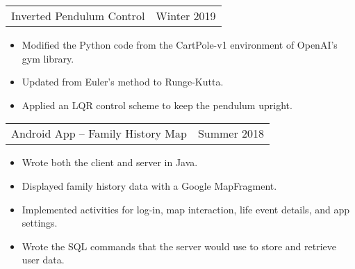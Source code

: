 \documentclass{article}
\newenvironment{compactItemize}{
  \begin{itemize}[itemsep=0ex, parsep=0ex, partopsep=0ex, topsep= -7pt]
}{
  \end{itemize}
}
\newcommand{\project}[2]{
  \begingroup
  \setlength{\tabcolsep}{0ex}
  \begin{tabularx}{\linewidth}{X r}
    #1 & %
    #2\\ %
  \end{tabularx}%
  \endgroup%
}
\begin{document}
\project{Inverted Pendulum Control}{Winter 2019}
\begin{compactItemize}
  \item Modified the Python code from the CartPole-v1 environment of OpenAI's gym library.
  \item Updated from Euler's method to Runge-Kutta.
  \item Applied an LQR control scheme to keep the pendulum upright.
\end{compactItemize}
\medskip

\project{Android App -- Family History Map}{Summer 2018}
\begin{compactItemize}
  \item Wrote both the client and server in Java.
  \item Displayed family history data with a Google MapFragment.
  \item Implemented activities for log-in, map interaction, life event details, and app settings.
  \item Wrote the SQL commands that the server would use to store and retrieve user data.
\end{compactItemize}
\end{document}
